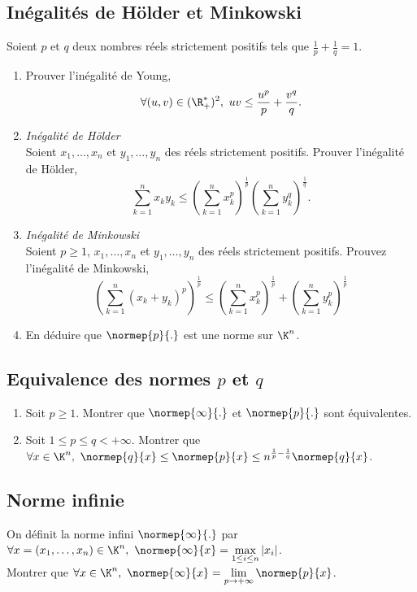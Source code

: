 \documentclass{book}
\begin{document}
	\subsection{Inégalités de Hölder et Minkowski}
	Soient $p$ et $q$ deux nombres réels strictement positifs tels que $\displaystyle\frac{1}{p}+\frac{1}{q}=1$.
	\begin{enumerate}
		\item Prouver l'inégalité de Young, $$\displaystyle \forall(u,v)\in(\R_+^*)^2,\ uv\leq\frac{u^p}{p}+\frac{v^q}{q}.$$
		\item \textit{Inégalité de Hölder}\\Soient $x_1,\dots,x_n$ et $y_1,\dots,y_n$ des réels strictement positifs. Prouver l'inégalité de Hölder, $$\sum_{k=1}^nx_ky_k\leq\left(\sum_{k=1}^nx_k^p\right)^\frac{1}{p}\left(\sum_{k=1}^ny_k^q\right)^\frac{1}{q}.$$
		\item \textit{Inégalité de Minkowski}\\Soient $p\geq 1$, $x_1,\dots,x_n$ et $y_1,\dots,y_n$ des réels strictement positifs. Prouvez l'inégalité de Minkowski, $$\left(\sum_{k=1}^n(x_k+y_k)^p\right)^\frac{1}{p}\leq\left(\sum_{k=1}^nx_k^p\right)^\frac{1}{p}+\left(\sum_{k=1}^ny_k^p\right)^\frac{1}{p}$$
		\item En déduire que $\normep{p}{.}$ est une norme sur $\K^n$.
	\end{enumerate}
	
	\subsection{Equivalence des normes $p$ et $q$}
	\begin{enumerate}[leftmargin=*]
		\item Soit $p\geq 1$. Montrer que $\normep{\infty}{.}$ et $\normep{p}{.}$ sont équivalentes.
		\item Soit $1\leq p\leq q<+\infty$. Montrer que $\forall x\in \K^n,\ \normep{q}{x}\leq \normep{p}{x}\leq n^{\frac{1}{p}-\frac{1}{q}}\normep{q}{x}$.
	\end{enumerate}
	
	\subsection{Norme infinie}
	On définit la norme infini $\normep{\infty}{.}$ par $\forall x=(x_1,\dots,x_n)\in \K^n,\ \normep{\infty}{x}=\max\limits_{1\leq i\leq n}|x_i|$.\\
	Montrer que $\forall x\in \K^n,\ \normep{\infty}{x}=\lim\limits_{p\to+\infty}\normep{p}{x}$.
	
\end{document}

